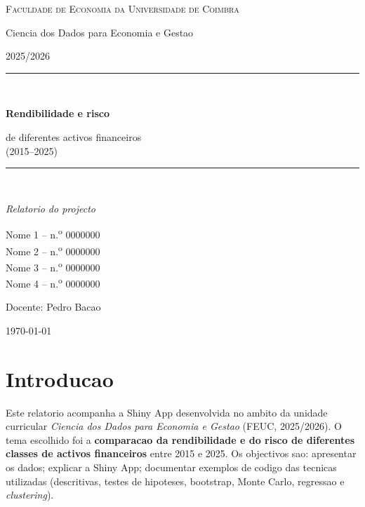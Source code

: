 \documentclass[11pt,a4paper]{article}
\begin{document}
\begin{titlepage}
  \thispagestyle{empty}
  \centering
  \vspace*{2cm}

  {\Large\scshape Faculdade de Economia da Universidade de Coimbra\par}
  \vspace{0.4cm}
  {\large Ciencia dos Dados para Economia e Gestao\par}
  {\large 2025/2026\par}

  \vspace{3cm}
  \rule{\linewidth}{0.5pt}\\[0.6cm]
  {\Huge\bfseries Rendibilidade e risco\par}
  \vspace{0.2cm}
  {\Large de diferentes activos financeiros\\(2015--2025)\par}
  \rule{\linewidth}{0.5pt}\\[1cm]

  {\large\itshape Relatorio do projecto\par}

  \vfill
  {\large
    Nome 1 \quad -- \quad n.\textsuperscript{o} 0000000\\[0.2cm]
    Nome 2 \quad -- \quad n.\textsuperscript{o} 0000000\\[0.2cm]
    Nome 3 \quad -- \quad n.\textsuperscript{o} 0000000\\[0.2cm]
    Nome 4 \quad -- \quad n.\textsuperscript{o} 0000000\par
  }
  \vspace{1.5cm}
  {\large Docente: Pedro Bacao\par}
  {\large \today\par}
\end{titlepage}

\tableofcontents
\newpage

\section{Introducao}

Este relatorio acompanha a Shiny App desenvolvida no ambito da unidade
curricular \emph{Ciencia dos Dados para Economia e Gestao} (FEUC,
2025/2026). O tema escolhido foi a \textbf{comparacao da rendibilidade
e do risco de diferentes classes de activos financeiros} entre 2015 e
2025. Os objectivos sao: apresentar os dados; explicar a Shiny App;
documentar exemplos de codigo das tecnicas utilizadas (descritivas,
testes de hipoteses, bootstrap, Monte Carlo, regressao e
\emph{clustering}).
\end{document}
